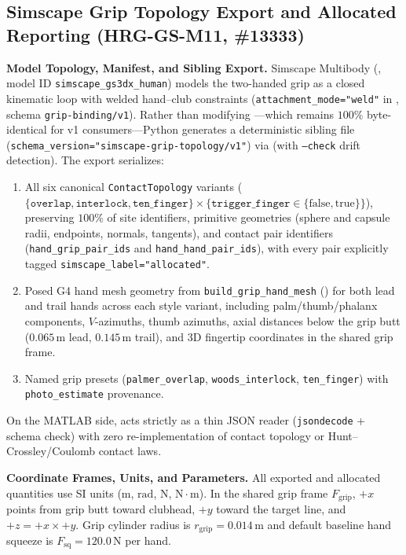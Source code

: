 \documentclass[11pt,a4paper]{article}
\begin{document}
\subsection{Simscape Grip Topology Export and Allocated Reporting (HRG-GS-M11, \#13333)}
\textbf{Model Topology, Manifest, and Sibling Export.}
Simscape Multibody (, model ID \texttt{simscape\_gs3dx\_human}) models the two-handed grip as a closed kinematic loop with welded hand--club constraints (\texttt{attachment\_mode="weld"} in , schema \texttt{grip-binding/v1}). Rather than modifying ---which remains $100\%$ byte-identical for v1 consumers---Python generates a deterministic sibling file  (\texttt{schema\_version="simscape-grip-topology/v1"}) via  (with \texttt{--check} drift detection). The export serializes:
\begin{enumerate}[leftmargin=*,noitemsep]
\item All six canonical \texttt{ContactTopology} variants ($\{\texttt{overlap}, \texttt{interlock}, \texttt{ten\_finger}\} \times \{\texttt{trigger\_finger} \in \{\text{false}, \text{true}\}\}$), preserving $100\%$ of site identifiers, primitive geometries (sphere and capsule radii, endpoints, normals, tangents), and contact pair identifiers (\texttt{hand\_grip\_pair\_ids} and \texttt{hand\_hand\_pair\_ids}), with every pair explicitly tagged \texttt{simscape\_label="allocated"}.
\item Posed G4 hand mesh geometry from \texttt{build\_grip\_hand\_mesh} () for both lead and trail hands across each style variant, including palm/thumb/phalanx components, $V$-azimuths, thumb azimuths, axial distances below the grip butt ($0.065$\,m lead, $0.145$\,m trail), and 3D fingertip coordinates in the shared grip frame.
\item Named grip presets (\texttt{palmer\_overlap}, \texttt{woods\_interlock}, \texttt{ten\_finger}) with \texttt{photo\_estimate} provenance.
\end{enumerate}
On the MATLAB side,  acts strictly as a thin JSON reader (\texttt{jsondecode} + schema check) with zero re-implementation of contact topology or Hunt--Crossley/Coulomb contact laws.

\textbf{Coordinate Frames, Units, and Parameters.}
All exported and allocated quantities use SI units ($\mathrm{m}$, $\mathrm{rad}$, $\mathrm{N}$, $\mathrm{N\cdot m}$). In the shared grip frame $F_{\mathrm{grip}}$, $+x$ points from grip butt toward clubhead, $+y$ toward the target line, and $+z = +x \times +y$. Grip cylinder radius is $r_{\mathrm{grip}} = 0.014$\,m and default baseline hand squeeze is $F_{\mathrm{sq}} = 120.0$\,N per hand.
\end{document}
